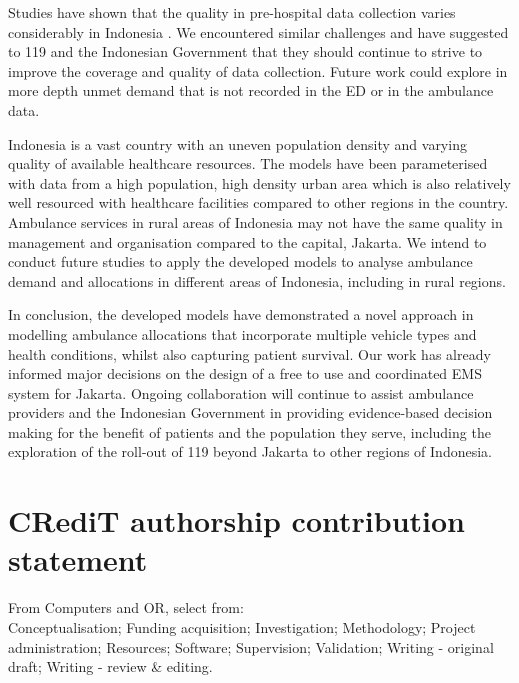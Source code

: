\documentclass[preprint,12pt]{elsarticle}
\begin{document}
Studies have shown that the quality in pre-hospital data collection varies considerably in Indonesia \cite{hooper2019_datacollection}. We encountered similar challenges and have suggested to 119 and the Indonesian Government that they should continue to strive to improve the coverage and quality of data collection. Future work could explore in more depth unmet demand that is not recorded in the ED or in the ambulance data.

Indonesia is a vast country with an uneven population density and varying quality of available healthcare resources. The models have been parameterised with data from a high population, high density urban area which is also relatively well resourced with healthcare facilities compared to other regions in the country. Ambulance services in rural areas of Indonesia may not have the same quality in management and organisation compared to the capital, Jakarta. We intend to conduct future studies to apply the developed models to analyse ambulance demand and allocations in different areas of Indonesia, including in rural regions.

In conclusion, the developed models have demonstrated a novel approach in modelling ambulance allocations that incorporate multiple vehicle types and health conditions, whilst also capturing patient survival. Our work has already informed major decisions on the design of a free to use and coordinated EMS system for Jakarta. Ongoing collaboration will continue to assist ambulance providers and the Indonesian Government in providing evidence-based decision making for the benefit of patients and the population they serve, including the exploration of the roll-out of 119 beyond Jakarta to other regions of Indonesia. 

\section*{CRediT authorship contribution statement}

From Computers and OR, select from:\\

Conceptualisation; Funding acquisition; Investigation; Methodology; Project administration; Resources; Software; Supervision; Validation; Writing - original draft; Writing - review \& editing.\\
\end{document}
